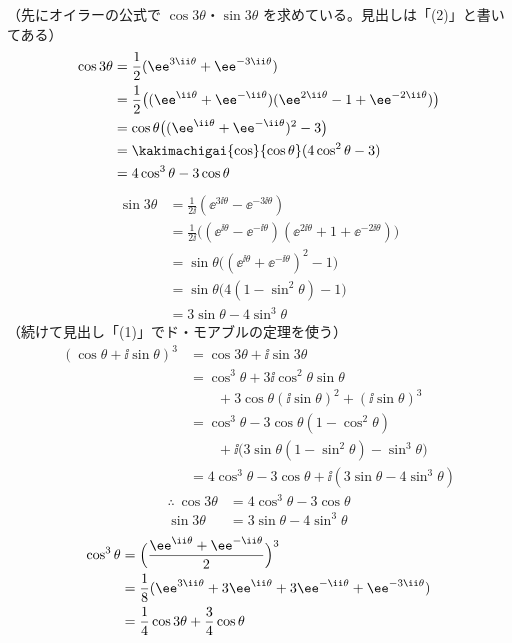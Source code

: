 （先にオイラーの公式で $\cos3\theta$・$\sin3\theta$ を求めている。見出しは「(2)」と書いてある）
\begin{align*}
\cos3\theta&=\frac{1}{2}(\ee^{3\ii\theta}+\ee^{-3\ii\theta})\\
&=\frac{1}{2}\bigl((\ee^{\ii\theta}+\ee^{-\ii\theta})(\ee^{2\ii\theta}-1+\ee^{-2\ii\theta})\bigr)\\
&=\cos\theta\bigl((\ee^{\ii\theta}+\ee^{-\ii\theta})^{2}-3\bigr)\\
&=\kakimachigai{\cos}{\cos\theta}(4\cos^{2}\theta-3)\\
&=4\cos^{3}\theta-3\cos\theta
\end{align*}
\begin{align*}
\sin3\theta&=\frac{1}{2\ii}(\ee^{3\ii\theta}-\ee^{-3\ii\theta})\\
&=\frac{1}{2\ii}\bigl((\ee^{\ii\theta}-\ee^{-\ii\theta})(\ee^{2\ii\theta}+1+\ee^{-2\ii\theta})\bigr)\\
&=\sin\theta\bigl((\ee^{\ii\theta}+\ee^{-\ii\theta})^{2}-1\bigr)\\
&=\sin\theta\bigl(4(1-\sin^{2}\theta)-1\bigr)\\
&=3\sin\theta-4\sin^{3}\theta
\end{align*}
（続けて見出し「(1)」でド・モアブルの定理を使う）
\begin{align*}
(\cos\theta+\ii\sin\theta)^{3}&=\cos3\theta+\ii\sin3\theta\\
&=\cos^{3}\theta+3\ii\cos^{2}\theta\sin\theta\\
&\qquad+3\cos\theta(\ii\sin\theta)^{2}+(\ii\sin\theta)^{3}\\
&=\cos^{3}\theta-3\cos\theta(1-\cos^{2}\theta)\\
&\qquad+\ii\bigl(3\sin\theta(1-\sin^{2}\theta)-\sin^{3}\theta\bigr)\\
&=4\cos^{3}\theta-3\cos\theta+\ii(3\sin\theta-4\sin^{3}\theta)
\end{align*}
\begin{align*}
\therefore\ \cos3\theta&=4\cos^{3}\theta-3\cos\theta\\
\sin3\theta&=3\sin\theta-4\sin^{3}\theta
\end{align*}
\begin{align*}
\cos^{3}\theta&=\Bigl(\frac{\ee^{\ii\theta}+\ee^{-\ii\theta}}{2}\Bigr)^{3}\\
&=\frac{1}{8}(\ee^{3\ii\theta}+3\ee^{\ii\theta}+3\ee^{-\ii\theta}+\ee^{-3\ii\theta})\\
&=\frac{1}{4}\cos3\theta+\frac{3}{4}\cos\theta
\end{align*}
